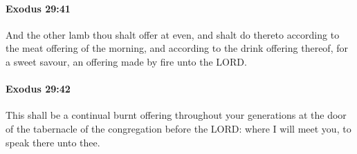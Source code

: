 		\paragraph{Exodus 29:41} %
			\label{EXODUS-29-41}

			And the other lamb thou shalt offer at even, and shalt do thereto according to the meat offering of the morning, and according to the drink offering thereof, for a sweet savour, an offering made by fire unto the LORD.


		\paragraph{Exodus 29:42} %
			\label{EXODUS-29-42}

			This shall be a continual burnt offering throughout your generations at the door of the tabernacle of the congregation before the LORD: where I will meet you, to speak there unto thee.

